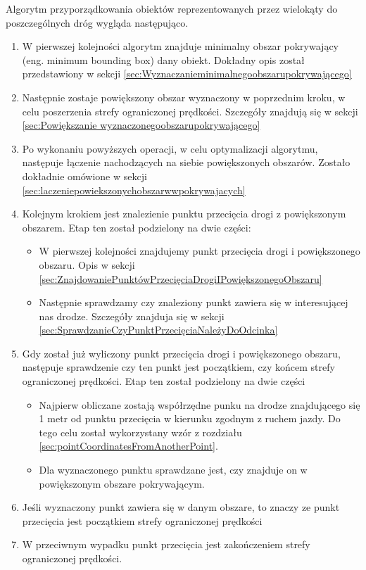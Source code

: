 Algorytm przyporządkowania obiektów reprezentowanych przez wielokąty do poszczególnych dróg wygląda następująco.
\begin{enumerate}
\item W pierwszej kolejności algorytm znajduje minimalny obszar pokrywający (eng. minimum bounding box) dany obiekt. Dokładny opis został przedstawiony w sekcji \ref{sec:Wyznaczanieminimalnegoobszarupokrywającego}
\item Następnie zostaje powiększony obszar wyznaczony w poprzednim kroku, w celu poszerzenia strefy ograniczonej prędkości. Szczegóły znajdują się w sekcji \ref{sec:Powiększanie wyznaczonegoobszarupokrywającego}
\item Po wykonaniu powyższych operacji, w celu optymalizacji algorytmu, następuje łączenie nachodzących na siebie powiększonych obszarów.  Zostało dokładnie omówione w sekcji \ref{sec:laczeniepowiekszonychobszarwwpokrywajacych}
\item Kolejnym krokiem jest znalezienie punktu przecięcia drogi z powiększonym obszarem. Etap ten został podzielony na dwie części:
\begin{itemize}
\item W pierwszej kolejności znajdujemy punkt przecięcia drogi i powiększonego obszaru. Opis w sekcji \ref{sec:ZnajdowaniePunktówPrzecięciaDrogiIPowiększonegoObszaru}
\item Następnie sprawdzamy czy znaleziony punkt zawiera się w interesującej nas drodze. Szczegóły znajduja się w sekcji \ref{sec:SprawdzanieCzyPunktPrzecięciaNależyDoOdcinka}
\end{itemize}
\item Gdy został już wyliczony punkt przecięcia drogi i powiększonego obszaru, następuje sprawdzenie czy ten punkt jest początkiem, czy końcem strefy ograniczonej prędkości. Etap ten został podzielony na dwie części
\begin{itemize}
\item Najpierw obliczane zostają współrzędne punku na drodze znajdującego się 1 metr od punktu przecięcia w kierunku zgodnym z ruchem jazdy. Do tego celu został wykorzystany wzór z rozdziału \ref{sec:pointCoordinatesFromAnotherPoint}.
\item Dla wyznaczonego punktu sprawdzane jest, czy znajduje on w powiększonym obszare pokrywającym.
\end{itemize}
\item Jeśli wyznaczony punkt zawiera się w danym obszare, to znaczy ze punkt przecięcia jest początkiem strefy ograniczonej prędkości
\item W przeciwnym wypadku punkt przecięcia jest zakończeniem strefy ograniczonej prędkości.
\end{enumerate}


